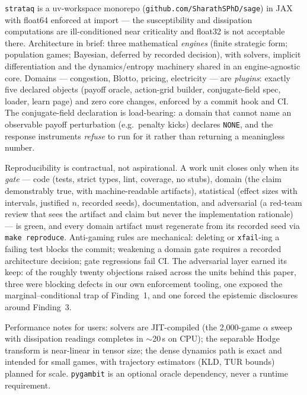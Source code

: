 \texttt{strataq} is a uv-workspace monorepo (\texttt{github.com/SharathSPhD/sage})
in JAX with float64 enforced at import --- the susceptibility and dissipation
computations are ill-conditioned near criticality and float32 is not
acceptable there. Architecture in brief: three mathematical \emph{engines}
(finite strategic form; population games; Bayesian, deferred by recorded
decision), with solvers, implicit differentiation and the dynamics/entropy
machinery shared in an engine-agnostic core. Domains --- congestion, Blotto,
pricing, electricity --- are \emph{plugins}: exactly five declared objects
(payoff oracle, action-grid builder, conjugate-field spec, loader, learn page)
and zero core changes, enforced by a commit hook and CI. The conjugate-field
declaration is load-bearing: a domain that cannot name an observable payoff
perturbation (e.g.\ penalty kicks) declares \texttt{NONE}, and the response
instruments \emph{refuse} to run for it rather than returning a meaningless
number.

Reproducibility is contractual, not aspirational. A work unit closes only when
its \emph{gate} --- code (tests, strict types, lint, coverage, no stubs),
domain (the claim demonstrably true, with machine-readable artifacts),
statistical (effect sizes with intervals, justified $n$, recorded seeds),
documentation, and adversarial (a red-team review that sees the artifact and
claim but never the implementation rationale) --- is green, and every domain
artifact must regenerate from its recorded seed via \texttt{make reproduce}.
Anti-gaming rules are mechanical: deleting or \texttt{xfail}-ing a failing test
blocks the commit; weakening a domain gate requires a recorded architecture
decision; gate regressions fail CI. The adversarial layer earned its keep: of
the roughly twenty objections raised across the units behind this paper, three
were blocking defects in our own enforcement tooling, one exposed the
marginal--conditional trap of Finding~1, and one forced the epistemic
disclosures around Finding~3.

Performance notes for users: solvers are JIT-compiled (the 2{,}000-game
$\alpha$ sweep with dissipation readings completes in $\sim$20\,s on CPU);
the separable Hodge transform is near-linear in tensor size; the dense
dynamics path is exact and intended for small games, with trajectory
estimators (KLD, TUR bounds) planned for scale. \texttt{pygambit} is an
optional oracle dependency, never a runtime requirement.
